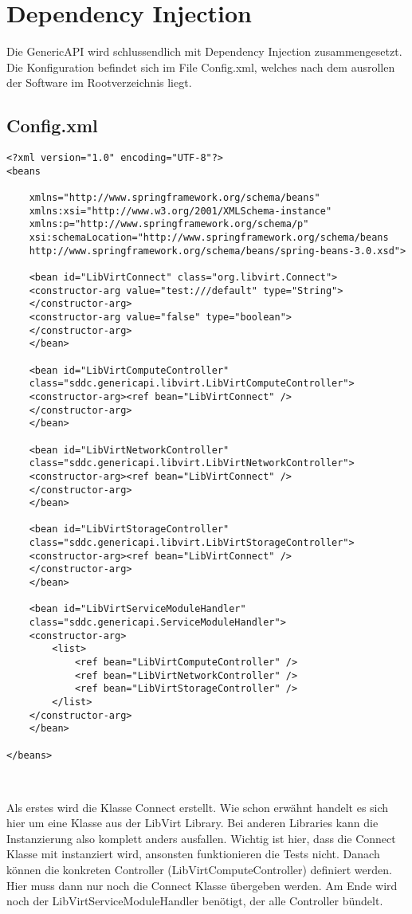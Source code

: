 \section{Dependency Injection}
Die GenericAPI wird schlussendlich mit Dependency Injection zusammengesetzt. 
Die Konfiguration befindet sich im File Config.xml, welches nach dem ausrollen der Software
im Rootverzeichnis liegt.

\subsection{Config.xml}
\begin{lstlisting}[style=XML,frame=single]
<?xml version="1.0" encoding="UTF-8"?>  
<beans  

    xmlns="http://www.springframework.org/schema/beans"  
    xmlns:xsi="http://www.w3.org/2001/XMLSchema-instance"  
    xmlns:p="http://www.springframework.org/schema/p"  
    xsi:schemaLocation="http://www.springframework.org/schema/beans  
    http://www.springframework.org/schema/beans/spring-beans-3.0.xsd">

	<bean id="LibVirtConnect" class="org.libvirt.Connect">
	<constructor-arg value="test:///default" type="String">
	</constructor-arg>
	<constructor-arg value="false" type="boolean">
	</constructor-arg>
	</bean>

	<bean id="LibVirtComputeController" 
	class="sddc.genericapi.libvirt.LibVirtComputeController">
	<constructor-arg><ref bean="LibVirtConnect" />
	</constructor-arg>
	</bean>
	
	<bean id="LibVirtNetworkController" 
	class="sddc.genericapi.libvirt.LibVirtNetworkController">
	<constructor-arg><ref bean="LibVirtConnect" />
	</constructor-arg>
	</bean>
	
	<bean id="LibVirtStorageController" 
	class="sddc.genericapi.libvirt.LibVirtStorageController">
	<constructor-arg><ref bean="LibVirtConnect" />
	</constructor-arg>
	</bean>
	
	<bean id="LibVirtServiceModuleHandler" 
	class="sddc.genericapi.ServiceModuleHandler">
	<constructor-arg>
		<list>
			<ref bean="LibVirtComputeController" />
			<ref bean="LibVirtNetworkController" />
			<ref bean="LibVirtStorageController" />
		</list>
	</constructor-arg>
	</bean>
	             
</beans>



\end{lstlisting}
Als erstes wird die Klasse Connect erstellt. Wie schon erwähnt handelt es sich hier 
um eine Klasse aus der LibVirt Library. Bei anderen Libraries kann die Instanzierung 
also komplett anders ausfallen. Wichtig ist hier, dass die Connect Klasse mit 
instanziert wird, ansonsten funktionieren die Tests nicht. Danach können die konkreten 
Controller (LibVirtComputeController) definiert werden. Hier muss dann nur noch die Connect 
Klasse übergeben werden. Am Ende wird noch der LibVirtServiceModuleHandler benötigt, 
der alle Controller bündelt.\\
